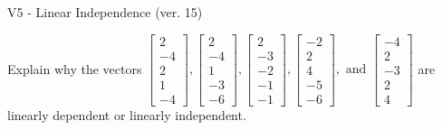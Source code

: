 \begin{exercise}
  \begin{exerciseTitle}V5 - Linear Independence (ver. 15)\end{exerciseTitle}
  \begin{exerciseStatement}
    Explain why the vectors \(\left[\begin{array}{r}
2 \\
-4 \\
2 \\
1 \\
-4
\end{array}\right] , \left[\begin{array}{r}
2 \\
-4 \\
1 \\
-3 \\
-6
\end{array}\right] , \left[\begin{array}{r}
2 \\
-3 \\
-2 \\
-1 \\
-1
\end{array}\right] , \left[\begin{array}{r}
-2 \\
2 \\
4 \\
-5 \\
-6
\end{array}\right] , \text{ and } \left[\begin{array}{r}
-4 \\
2 \\
-3 \\
2 \\
4
\end{array}\right]\) are linearly dependent or linearly independent.	



\end{exerciseStatement}
\end{exercise}
